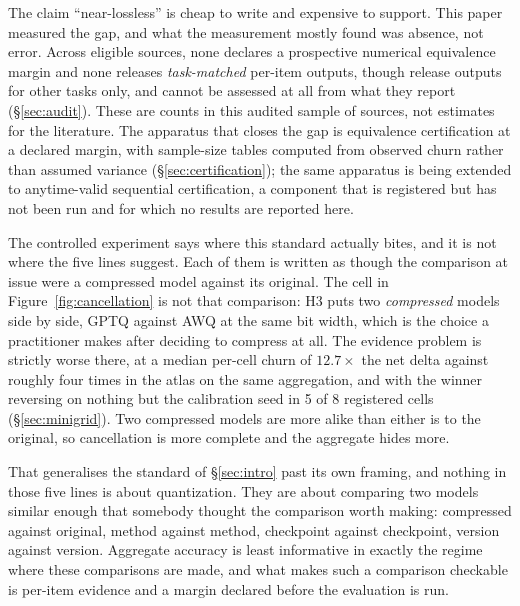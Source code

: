 The claim ``near-lossless'' is cheap to write and expensive to support. This
paper measured the gap, and what the measurement mostly found was absence, not
error. Across \AuditEligible{} eligible sources, none declares a prospective
numerical equivalence margin and none releases \emph{task-matched} per-item
outputs, though \AuditPerItemOtherTaskOnly{} release outputs for other tasks
only, and \AuditNotAssessable{} cannot be assessed at all from what they report
(\S\ref{sec:audit}). These are counts in this audited sample of
\AuditEligible{} sources, not estimates for the literature. The apparatus that
closes the gap is equivalence certification at a declared margin, with
sample-size tables computed from observed churn rather than assumed variance
(\S\ref{sec:certification}); the same apparatus is being extended to
anytime-valid sequential certification, a component that is registered but has
not been run and for which no results are reported here.

The controlled experiment says where this standard actually bites, and it is not
where the five lines suggest. Each of them is written as though the comparison
at issue were a compressed model against its original. The cell in
Figure~\ref{fig:cancellation} is not that comparison: H3 puts two
\emph{compressed} models side by side, GPTQ against AWQ at the same bit width,
which is the choice a practitioner makes after deciding to compress at all. The
evidence problem is strictly worse there, at a median per-cell churn of
$12.7\times$ the net delta against roughly four times in the atlas on the same
aggregation, and with the winner reversing on nothing but the calibration seed
in 5 of 8 registered cells (\S\ref{sec:minigrid}). Two compressed models are
more alike than either is to the original, so cancellation is more complete and
the aggregate hides more.

That generalises the standard of \S\ref{sec:intro} past its own framing, and
nothing in those five lines is about quantization. They are about comparing two
models similar enough that somebody thought the comparison worth making:
compressed against original, method against method, checkpoint against
checkpoint, version against version. Aggregate accuracy is least informative in
exactly the regime where these comparisons are made, and what makes such a
comparison checkable is per-item evidence and a margin declared before the
evaluation is run.
